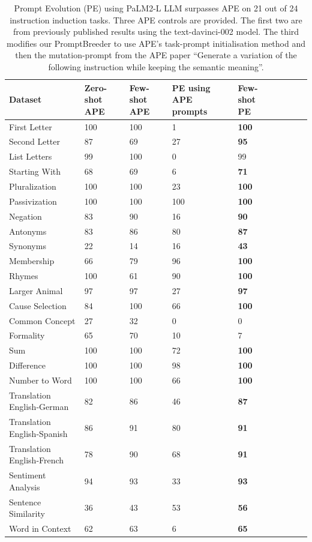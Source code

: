 \documentclass{article} %
\newcommand{\h}[1]{\textbf{#1}}
\begin{document}
\begin{table}[H]
\centering
\begin{tabularx}{\textwidth}{l*{8}{X}}
\toprule
Dataset         & Zero-shot APE & Few-shot APE & PE using APE prompts & Few-shot PE   \\
\bottomrule
First Letter    &            100  & 100 &1 &  \h{100} \\
Second Letter   &            87   & 69 &27 &  \h{95} \\
List Letters    &            99   & 100 &0 &  99 \\
Starting With   &            68   & 69 &6 &  \h{71} \\
Pluralization   &            100  & 100 &23 &  \h{100} \\
Passivization   &            100  & 100 &100 &  \h{100} \\
Negation        &            83   & 90 &16 &  \h{90} \\
Antonyms        &            83   & 86 &80 &  \h{87} \\
Synonyms        &            22   & 14 &16 &  \h{43} \\
Membership      &            66   & 79 &96 &  \h{100} \\
Rhymes          &            100  & 61 &90 &  \h{100} \\
Larger Animal   &            97   & 97 &27 &  \h{97} \\
Cause Selection &            84   & 100 &66 &  \h{100} \\
Common Concept  &            27   & 32 &0 &   0 \\
Formality       &            65   & 70 &10 &  7 \\
Sum             &            100  & 100 &72 &  \h{100} \\
Difference      &            100  & 100 &98 &  \h{100} \\
Number to Word  &            100  & 100 &66 &  \h{100} \\
Translation English-German  &  82 & 86 &46 &  \h{87} \\
Translation English-Spanish &  86 & 91 &80 &  \h{91} \\
Translation English-French  &  78 & 90 &68 &  \h{91} \\
Sentiment Analysis  &        94   & 93 &33 &  \h{93} \\
Sentence Similarity &        36   & 43 &53 &  \h{56} \\
Word in Context     &        62   & 63 &6 &  \h{65} \\
\bottomrule
\end{tabularx}
\caption{Prompt Evolution (PE) using PaLM2-L LLM surpasses APE on 21 out of 24 instruction induction tasks. Three APE controls are provided. The first two are from previously published results using  the  text-davinci-002  model.  The  third  modifies  our PromptBreeder  to  use  APE’s  task-prompt initialisation method and then the  mutation-prompt from the APE paper ``Generate a variation of the following instruction while keeping the semantic meaning''. 
}
\label{tab:ape_comparison}
\end{table}
\end{document}
